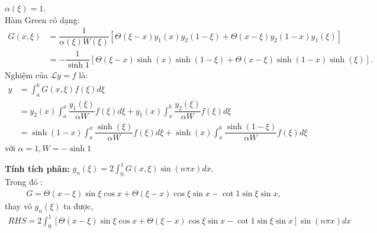 \documentclass{article}
\newcommand{\dps}{\displaystyle}
\newcommand{\f}[2]{\dfrac{#1}{#2}}
\begin{document}
$\alpha(\xi) = 1$.\\
Hàm Green có dạng:
\begin{align}
	G(x,\xi) &= \f{1}{\alpha(\xi) W(\xi)}\left[ \Theta(\xi - x) y_1(x) y_2(1-\xi) + \Theta(x - \xi) y_2(1-x) y_1(\xi) \right] \nonumber\\	
	 &= -\f{1}{\sinh 1}\left[ \Theta(\xi - x) \sinh(x) \sinh(1-\xi) + \Theta(x - \xi) \sinh(1-x) \sinh(\xi) \right]	.
\end{align}
Nghiệm của $\mathcal{L}y = f$ là:
\begin{align}
	y &= \int_a^b G(x,\xi) f(\xi) d\xi \nonumber \\
	& = y_2(x) \int_a^x \f{y_1(\xi)}{\alpha W}f(\xi) d\xi + y_1(x) \int_x^b \f{y_2(\xi)}{\alpha W}f(\xi) d\xi \nonumber \\
	& = \sinh (1-x) \int_a^x \f{\sinh (\xi)}{\alpha W}f(\xi) d\xi + \sinh (x) \int_x^b \f{\sinh (1-\xi)}{\alpha W}f(\xi) d\xi
\end{align}
với $\alpha = 1, W = -\sinh 1$

\textbf{Tính tích phân:} $g_n (\xi) = 2 \dps\int_{0}^{1} G(x,\xi) \sin (n\pi x) dx$. \\
Trong đó : 
\begin{align*}
	G = \Theta (x-\xi) \sin \xi \cos x + \Theta (\xi - x) \cos \xi \sin x - \cot 1 \sin \xi \sin x,
\end{align*}
thay vô $g_n (\xi)$ ta được,
\begin{align*}
	RHS=2 \int_{0}^{1} \left[\Theta (x-\xi) \sin \xi \cos x + \Theta (\xi - x) \cos \xi \sin x - \cot 1 \sin \xi \sin x\right] \sin (n\pi x) dx
\end{align*}




	
	
	
\end{document}
